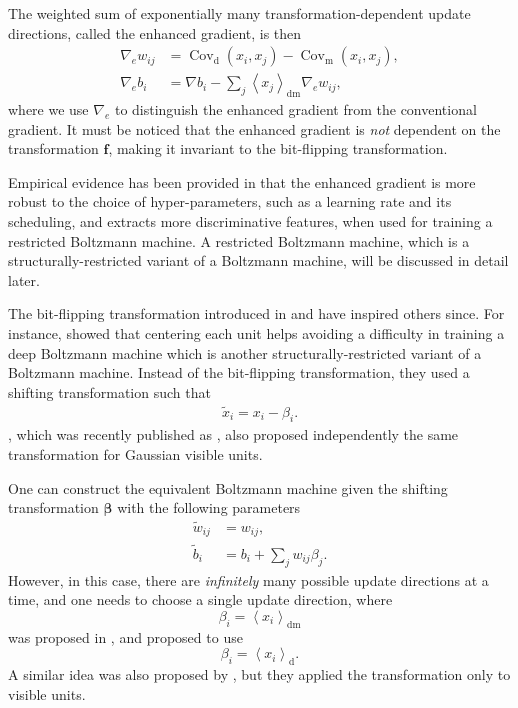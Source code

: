 \documentclass[dissertation,nocontribution]{aaltoseries}
\newcommand{\vect}[1]{\mathbf{#1}}
\newcommand{\vects}[1]{\boldsymbol{#1}}
\newcommand{\cov}[0]{\operatorname{Cov}}
\newcommand{\vf}[0]{\vect{f}}
\newcommand{\td}[0]{\text{d}}
\newcommand{\vbeta}[0]{\vects{\beta}}
\newcommand{\tf}[0]{\text{m}}
\newcommand{\tdf}[0]{\text{dm}}
\begin{document}
The weighted sum of exponentially many
transformation-dependent update directions, called the
enhanced gradient, is then
\begin{align}
    \label{eq:enh_w}
  \nabla_e w_{ij} &=  \cov_\td(x_i,x_j)-\cov_\tf(x_i,x_j),
  \\
    \label{eq:enh_b}
  \nabla_e b_i &= \nabla b_i - \sum_j
  \left<x_j\right>_\tdf\nabla_e w_{ij},
\end{align}
where we use $\nabla_e$ to distinguish the enhanced gradient
from the conventional gradient. It must be noticed that the
enhanced gradient is \textit{not} dependent on the
transformation $\vf$, making it invariant to the
bit-flipping transformation.

Empirical evidence has been provided in 
that the enhanced gradient is more robust to the choice of
hyper-parameters, such as a learning rate and its
scheduling, and extracts more discriminative features, when
used for training a restricted Boltzmann machine. A
restricted Boltzmann machine, which is a
structurally-restricted variant of a Boltzmann machine, will
be discussed in detail later.

The bit-flipping transformation introduced in
 and  have inspired
others since.  For instance, \citet{Montavon2012} showed
that centering each unit helps avoiding a difficulty in
training a deep Boltzmann machine which is another
structurally-restricted variant of a Boltzmann machine.
Instead of the bit-flipping transformation, they used a
shifting transformation such that
\begin{align*}
    \tilde{x}_i  = x_i - \beta_i.
\end{align*}
\citet{Cho2011dlufl}, which was recently published as
, also proposed independently the same
transformation for Gaussian visible units.

One can construct
the equivalent Boltzmann machine 
given the shifting transformation $\vbeta$ 
with the following parameters
\begin{align*}
    \tilde{w}_{ij} &= w_{ij}, \\
    \tilde{b}_i &= b_i + \sum_{j} w_{ij} \beta_j.
\end{align*}
However, in this case, there are \textit{infinitely} many
possible update directions at a time, and one needs to
choose a single update direction, where 
\[
\beta_i = \left< x_i \right>_\tdf
\]
was proposed in , and 
\citet{Montavon2012}
proposed to use 
\[
\beta_i = \left< x_i \right>_\td.
\]
A similar idea was also proposed by \citet{Tang2011}, but
they applied the transformation only to visible units.
\end{document}

